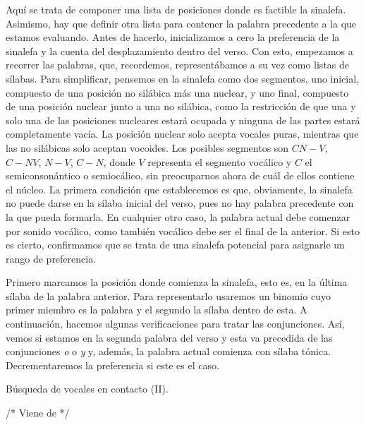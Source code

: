 Aquí se trata de componer una lista de posiciones donde es factible la sinalefa. Asimismo, hay que definir otra lista para contener la palabra precedente a la que estamos evaluando. Antes de hacerlo, inicializamos a cero la preferencia de la sinalefa y la cuenta del desplazamiento dentro del verso.  Con esto, empezamos a recorrer las palabras, que, recordemos, representábamos a su vez como listas de sílabas. Para simplificar, pensemos en la sinalefa como dos segmentos, uno inicial, compuesto de una posición no silábica más una nuclear, y uno final, compuesto de una posición nuclear junto a una no silábica, como la restricción de que una y solo una de las posiciones nucleares estará ocupada y ninguna de las partes estará completamente vacía. La posición nuclear solo acepta vocales puras, mientras que las no silábicas solo aceptan vocoides. Los posibles segmentos son $C N - V$, $C - N V$, $N - V$, $C - N$, donde $V$ representa el segmento vocálico y $C$ el semiconsonántico o semiocálico, sin preocuparnos  ahora de cuál de ellos contiene el núcleo. La primera condición que establecemos es que, obviamente, la sinalefa no puede darse en la sílaba inicial del verso, pues no hay palabra precedente con la que pueda formarla. En cualquier otro caso, la palabra actual debe comenzar por sonido vocálico, como también vocálico debe ser el final de la anterior. Si esto es cierto, confirmamos que se trata de una sinalefa potencial para asignarle un rango de preferencia.

Primero  marcamos la posición donde comienza la sinalefa, esto es, en la última sílaba de la palabra anterior. Para representarlo usaremos un binomio cuyo primer miembro es la palabra y el segundo la sílaba dentro de esta. A continuación, hacemos algunas verificaciones para tratar las conjunciones. Así, vemos si estamos en la segunda palabra del verso y esta va precedida de las conjunciones \textit{o} o \textit{y} y, además, la palabra actual comienza con sílaba tónica. Decrementaremos la preferencia si este es el caso.

\begin{algorithm}[!ht]
	\caption{Búsqueda de vocales en contacto (II).}\label{list:VerseMetre3}
	/* Viene de  */ \;
\end{algorithm}

